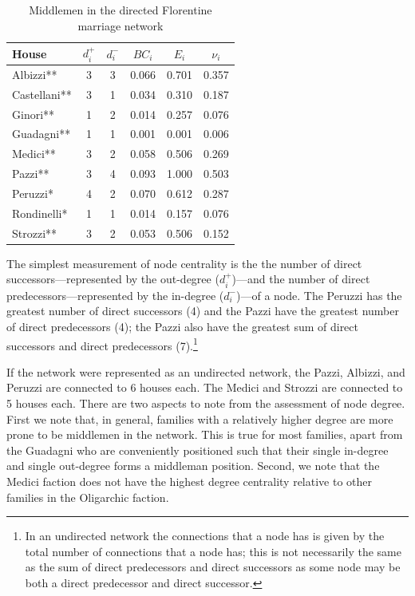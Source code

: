 \begin{table}
\begin{center}
\begin{tabular}{lccccc}
\hline \hline
House 	& $d^+_i$ & $d^-_i$ & $BC_i$    & $E_i$   & $\nu_i$  \\
\hline
Albizzi** & 3 & 3 						 & 0.066 	 & 0.701   & 0.357 	  \\
Castellani**  & 3 & 1 						 & 0.034 	 & 0.310   & 0.187 	  \\
Ginori** & 1 & 2 						 & 0.014 	 & 0.257   & 0.076    \\
Guadagni** & 1 & 1 						 & 0.001 	 & 0.001   & 0.006 	  \\
Medici** & 3 & 2 						 & 0.058 	 & 0.506   & 0.269 	  \\
Pazzi**  & 3 & 4 						 & 0.093 	 & 1.000   & 0.503    \\
Peruzzi*  & 4 & 2 						 & 0.070 	 & 0.612   & 0.287    \\
Rondinelli*  & 1 & 1 						 & 0.014 	 & 0.157   & 0.076    \\
Strozzi** & 3 & 2 						 & 0.053 	 & 0.506   & 0.152    \\ 
\hline \hline
\end{tabular}
\caption{Middlemen in the directed Florentine marriage network}
\label{tabFlorence}
\end{center}
\end{table}

The simplest measurement of node centrality is the the number of direct successors---represented by the out-degree ($d^+_i$)---and the number of direct predecessors---represented by the in-degree ($d^-_i$)---of a node. The Peruzzi has the greatest number of direct successors (4) and the Pazzi have the greatest number of direct predecessors (4); the Pazzi also have the greatest sum of direct successors and direct predecessors (7).\footnote{In an undirected network the connections that a node has is given by the total number of connections that a node has; this is not necessarily the same as the sum of direct predecessors and direct successors as some node may be both a direct predecessor and direct successor.}

If the network were represented as an undirected network, the Pazzi, Albizzi, and Peruzzi are connected to 6 houses each. The Medici and Strozzi are connected to 5 houses each. There are two aspects to note from the assessment of node degree. First we note that, in general, families with a relatively higher degree are more prone to be middlemen in the network. This is true for most families, apart from the Guadagni who are conveniently positioned such that their single in-degree and single out-degree forms a middleman position. Second, we note that the Medici faction does not have the highest degree centrality relative to other families in the Oligarchic faction.

